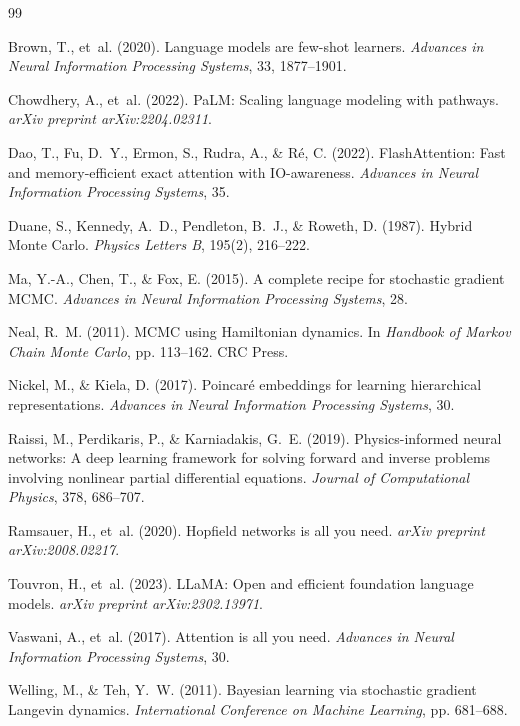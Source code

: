 \documentclass[11pt,a4paper]{article}
\begin{document}

\begin{thebibliography}{99}

Brown, T., et~al. (2020).
Language models are few-shot learners.
\textit{Advances in Neural Information Processing Systems}, 33, 1877--1901.

Chowdhery, A., et~al. (2022).
PaLM: Scaling language modeling with pathways.
\textit{arXiv preprint arXiv:2204.02311}.

Dao, T., Fu, D.~Y., Ermon, S., Rudra, A., \& R\'e, C. (2022).
FlashAttention: Fast and memory-efficient exact attention
with IO-awareness.
\textit{Advances in Neural Information Processing Systems}, 35.

Duane, S., Kennedy, A.~D., Pendleton, B.~J., \& Roweth, D. (1987).
Hybrid Monte Carlo.
\textit{Physics Letters B}, 195(2), 216--222.

Ma, Y.-A., Chen, T., \& Fox, E. (2015).
A complete recipe for stochastic gradient MCMC.
\textit{Advances in Neural Information Processing Systems}, 28.

Neal, R.~M. (2011).
MCMC using Hamiltonian dynamics.
In \textit{Handbook of Markov Chain Monte Carlo}, pp. 113--162.
CRC Press.

Nickel, M., \& Kiela, D. (2017).
Poincar\'e embeddings for learning hierarchical representations.
\textit{Advances in Neural Information Processing Systems}, 30.

Raissi, M., Perdikaris, P., \& Karniadakis, G.~E. (2019).
Physics-informed neural networks: A deep learning framework for
solving forward and inverse problems involving nonlinear partial
differential equations.
\textit{Journal of Computational Physics}, 378, 686--707.

Ramsauer, H., et~al. (2020).
Hopfield networks is all you need.
\textit{arXiv preprint arXiv:2008.02217}.

Touvron, H., et~al. (2023).
LLaMA: Open and efficient foundation language models.
\textit{arXiv preprint arXiv:2302.13971}.

Vaswani, A., et~al. (2017).
Attention is all you need.
\textit{Advances in Neural Information Processing Systems}, 30.

Welling, M., \& Teh, Y.~W. (2011).
Bayesian learning via stochastic gradient Langevin dynamics.
\textit{International Conference on Machine Learning}, pp. 681--688.

\end{thebibliography}
\end{document}
